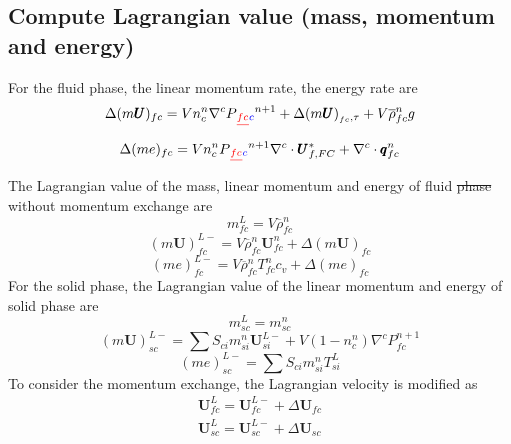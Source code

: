 \documentclass[preprint,12pt]{elsarticle}
\providecommand{\DIFadd}[1]{{\protect\color{blue}\uwave{#1}}} %
\providecommand{\DIFdel}[1]{{\protect\color{red}\sout{#1}}}                      %
\providecommand{\DIFaddbegin}{} %
\providecommand{\DIFaddend}{} %
\providecommand{\DIFdelbegin}{} %
\providecommand{\DIFdelend}{} %
\newcommand{\DIFscaledelfig}{0.5}
\newlength{\DIFdelgraphicswidth} %
\newlength{\DIFdelgraphicsheight} %
\newcommand{\DIFaddincludegraphics}[2][]{{\color{blue}\fbox{\DIFOincludegraphics[#1]{#2}}}} %
\newcommand{\DIFdelincludegraphics}[2][]{%
\sbox{\DIFdelgraphicsbox}{\DIFOincludegraphics[#1]{#2}}%
\settoboxwidth{\DIFdelgraphicswidth}{\DIFdelgraphicsbox} %
\settoboxtotalheight{\DIFdelgraphicsheight}{\DIFdelgraphicsbox} %
\scalebox{\DIFscaledelfig}{%
\parbox[b]{\DIFdelgraphicswidth}{\usebox{\DIFdelgraphicsbox}\\[-\baselineskip] \rule{\DIFdelgraphicswidth}{0em}}\llap{\resizebox{\DIFdelgraphicswidth}{\DIFdelgraphicsheight}{%
\setlength{\unitlength}{\DIFdelgraphicswidth}%
\begin{picture}(1,1)%
\thicklines\linethickness{2pt} %
{\color[rgb]{1,0,0}\put(0,0){\framebox(1,1){}}}%
{\color[rgb]{1,0,0}\put(0,0){\line( 1,1){1}}}%
{\color[rgb]{1,0,0}\put(0,1){\line(1,-1){1}}}%
\end{picture}%
}\hspace*{3pt}}} %
} %
\DeclareRobustCommand{\DIFaddbegin}{\DIFOaddbegin \let\includegraphics\DIFaddincludegraphics} %
\DeclareRobustCommand{\DIFaddend}{\DIFOaddend \let\includegraphics\DIFOincludegraphics} %
\DeclareRobustCommand{\DIFdelbegin}{\DIFOdelbegin \let\includegraphics\DIFdelincludegraphics} %
\DeclareRobustCommand{\DIFdelend}{\DIFOaddend \let\includegraphics\DIFOincludegraphics} %
\begin{document}
\subsection{\textsf{Compute Lagrangian value (mass, momentum and energy)}}
For the fluid phase, the linear momentum rate, the energy rate are
\begin{equation}
 \Delta (m \pmb{U})_{fc} = V n_c^n \nabla^c P\DIFdelbegin \DIFdel{_{fc}}\DIFdelend \DIFaddbegin \DIFadd{_{c}}\DIFaddend ^{n+1} +\Delta (m \pmb{U})_{_{fc},\tau} + V \overline{\rho}_{fc}^n g
\end{equation}
%
%
\begin{equation}
 \Delta (me)_{fc} = V n_c^n P\DIFdelbegin \DIFdel{_{fc}}\DIFdelend \DIFaddbegin \DIFadd{_{c}}\DIFaddend ^{n+1} \nabla^c \cdot \pmb{U}_{f,FC}^{*} + \nabla^c \cdot \pmb{q}_{fc}^n
\end{equation}
%
%
The Lagrangian value of the mass, linear momentum and energy of fluid \DIFdelbegin \DIFdel{phase }\DIFdelend \DIFaddbegin \DIFadd{phases }\DIFaddend without momentum exchange are
%
%
\begin{equation}
 m_{fc}^L = V \overline{\rho}_{fc}^n 
\end{equation}
%
%
\begin{equation}
 (m \pmb{U})_{fc}^{L-} = V \overline{\rho}_{fc}^n \pmb{U}_{fc}^n + \Delta (m \pmb{U})_{fc} 
\end{equation}
%
%
\begin{equation}
 (me)_{fc}^{L-} = V \overline{\rho}_{fc}^n T_{fc}^n    c_v + \Delta (me)_{fc} 
\end{equation}
%
%
For the solid phase, the Lagrangian value of the linear momentum and energy of solid phase are
%
\begin{equation}
 m_{sc}^L = m_{sc}^n
\end{equation}
%
\begin{equation}
 (m \pmb{U})_{sc}^{L-} = \sum{S_{ci} m_{si}^n \pmb{U}_{si}^{L-}} + V (1-n_c^n) \nabla^c P_{fc}^{n+1}
\end{equation}
%
\begin{equation}
 (me)_{sc}^{L-} =  \sum{S_{ci} m_{si}^n T_{si}^L}
\end{equation}
%
%
To consider the momentum exchange, the Lagrangian velocity is modified as
%
\begin{equation}
\begin{gathered}
\pmb{U}_{fc}^{L} = \pmb{U}_{fc}^{L-} + \Delta \pmb{U}_{fc} \\
\pmb{U}_{sc}^{L} = \pmb{U}_{sc}^{L-} + \Delta \pmb{U}_{sc}
\end{gathered}
\end{equation}
\end{document}
